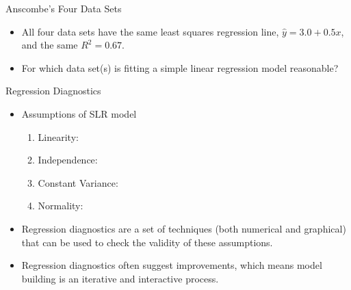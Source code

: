 \documentclass[10pt]{beamer}
\begin{document}
\begin{frame}{Anscombe's Four Data Sets}
\vspace{-3cm}
\begin{itemize}
\item All four data sets have the same least squares regression line, $\hat{y} = 3.0 + 0.5x$, and the same $R^2 = 0.67$.
\vspace{5pt}
\item For which data set(s) is fitting a simple linear regression model reasonable?
\end{itemize}
\end{frame}

\begin{frame}{Regression Diagnostics}
\begin{itemize}
\item Assumptions of SLR model 
\begin{enumerate}
\item Linearity:
\vspace{10pt}
\item Independence:
\vspace{10pt}
\item Constant Variance:
\vspace{10pt}
\item Normality:
\end{enumerate}
\vspace{10pt}
\item Regression diagnostics are a set of techniques (both numerical and graphical) that can be used to check the validity of these assumptions.
\vspace{5pt}
\item Regression diagnostics often suggest improvements, which means model building is an iterative and interactive process.
\end{itemize}
\end{frame}
\end{document}
